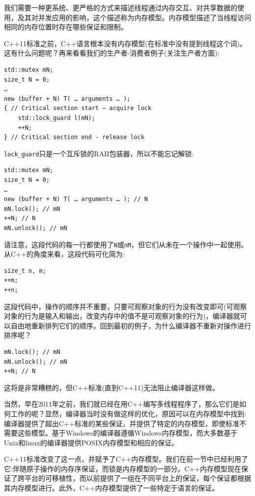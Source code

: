 我们需要一种更系统、更严格的方式来描述线程通过内存交互、对共享数据的使用，及其对并发应用的影响，这个描述称为内存模型。内存模型描述了当线程访问相同的内存位置时存在哪些保证和限制。

C++11标准之前，C++语言根本没有内存模型(在标准中没有提到线程这个词)。这有什么问题呢？再来看看我们的生产者-消费者例子(关注生产者方面):

\begin{lstlisting}[style=styleCXX]
std::mutex mN;
size_t N = 0;
…
new (buffer + N) T( … arguments … );
{ // Critical section start – acquire lock
	std::lock_guard l(mN);
	++N;
} // Critical section end - release lock
\end{lstlisting}

\texttt{lock\_guard}只是一个互斥锁的RAII包装器，所以不能忘记解锁:

\begin{lstlisting}[style=styleCXX]
std::mutex mN;
size_t N = 0;
…
new (buffer + N) T( … arguments … ); // N
mN.lock(); // mN
++N; // N
mN.unlock(); // mN
\end{lstlisting}

请注意，这段代码的每一行都使用了\texttt{N}或\texttt{nM}，但它们从未在一个操作中一起使用。从C++的角度来看，这段代码可化简为:

\begin{lstlisting}[style=styleCXX]
size_t n, m;
++m;
++n;
\end{lstlisting}

这段代码中，操作的顺序并不重要，只要可观察对象的行为没有改变即可(可观察对象的行为是输入和输出，改变内存中的值不是可观察对象的行为)，编译器就可以自由地重新排列它们的顺序。回到最初的例子，为什么编译器不重新对操作进行排序呢？

\begin{lstlisting}[style=styleCXX]
mN.lock(); // mN
mN.unlock(); // mN
++N; // N
\end{lstlisting}

这将是非常糟糕的，但C++标准(直到C++11)无法阻止编译器这样做。

当然，早在2011年之前，我们就已经在用C++编写多线程程序了，那么它们是如何工作的呢？显然，编译器当时没有做这样的优化，原因可以在内存模型中找到:编译器提供了超出C++标准的某些保证，并提供了特定的内存模型，即使标准不需要这些模型。基于Windows的编译器遵循Windows内存模型，而大多数基于Unix和linux的编译器提供POSIX内存模型和相应的保证。

C++11标准改变了这一点，并赋予了C++内存模型。我们在前一节中已经利用了它:伴随原子操作的内存序保证，而锁是内存模型的一部分。C++内存模型现在保证了跨平台的可移植性，而以前提供了一组在不同平台上的保证，每个保证都根据其内存模型进行。此外，C++内存模型提供了一些特定于语言的保证。

